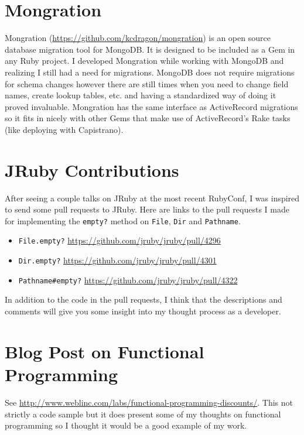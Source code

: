 \documentclass[12pt]{article}
\begin{document}
\section{Mongration}
Mongration (\url{https://github.com/kcdragon/mongration}) is an open source database migration tool for MongoDB. It is designed to be included as a Gem in any Ruby project. I developed Mongration while working with MongoDB and realizing I still had a need for migrations. MongoDB does not require migrations for schema changes however there are still times when you need to change field names, create lookup tables, etc. and having a standardized way of doing it proved invaluable. Mongration has the same interface as ActiveRecord migrations so it fits in nicely with other Gems that make use of ActiveRecord’s Rake tasks (like deploying with Capistrano).

\section{JRuby Contributions}
After seeing a couple talks on JRuby at the most recent RubyConf, I was inspired to send some pull requests to JRuby. Here are links to the pull requests I made for implementing the \verb|empty?| method on \verb|File|, \verb|Dir| and \verb|Pathname|.

\begin{itemize}
\item \verb|File.empty?| \url{https://github.com/jruby/jruby/pull/4296}
\item \verb|Dir.empty?| \url{https://github.com/jruby/jruby/pull/4301}
\item \verb|Pathname#empty?| \url{https://github.com/jruby/jruby/pull/4322}
\end{itemize}

In addition to the code in the pull requests, I think that the descriptions and comments will give you some insight into my thought process as a developer.

\section{Blog Post on Functional Programming}
See \url{http://www.weblinc.com/labs/functional-programming-discounts/}. This not strictly a code sample but it does present some of my thoughts on functional programming so I thought it would be a good example of my work.
\end{document}
